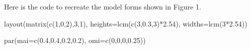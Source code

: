 \documentclass[
  11pt,
]{article}
\newenvironment{Shaded}{}{}
\newcommand{\AttributeTok}[1]{#1}
\newcommand{\DecValTok}[1]{#1}
\newcommand{\FloatTok}[1]{#1}
\newcommand{\FunctionTok}[1]{#1}
\newcommand{\NormalTok}[1]{#1}
\newcommand{\SpecialCharTok}[1]{\textcolor[rgb]{0.00,0.50,0.50}{#1}}
\begin{document}
Here is the code to recreate the model forms shown in Figure 1.

\begin{Shaded}
\begin{Highlighting}[]
\FunctionTok{layout}\NormalTok{(}\FunctionTok{matrix}\NormalTok{(}\FunctionTok{c}\NormalTok{(}\DecValTok{1}\NormalTok{,}\DecValTok{0}\NormalTok{,}\DecValTok{2}\NormalTok{),}\DecValTok{3}\NormalTok{,}\DecValTok{1}\NormalTok{),}
       \AttributeTok{heights=}\FunctionTok{lcm}\NormalTok{(}\FunctionTok{c}\NormalTok{(}\DecValTok{3}\NormalTok{,}\FloatTok{0.3}\NormalTok{,}\DecValTok{3}\NormalTok{)}\SpecialCharTok{*}\FloatTok{2.54}\NormalTok{),}
       \AttributeTok{widths=}\FunctionTok{lcm}\NormalTok{(}\DecValTok{3}\SpecialCharTok{*}\FloatTok{2.54}\NormalTok{))}

\FunctionTok{par}\NormalTok{(}\AttributeTok{mai=}\FunctionTok{c}\NormalTok{(}\FloatTok{0.4}\NormalTok{,}\FloatTok{0.4}\NormalTok{,}\FloatTok{0.2}\NormalTok{,}\FloatTok{0.2}\NormalTok{), }\AttributeTok{omi=}\FunctionTok{c}\NormalTok{(}\DecValTok{0}\NormalTok{,}\DecValTok{0}\NormalTok{,}\DecValTok{0}\NormalTok{,}\FloatTok{0.25}\NormalTok{))}


\end{Highlighting}
\end{Shaded}
\end{document}
